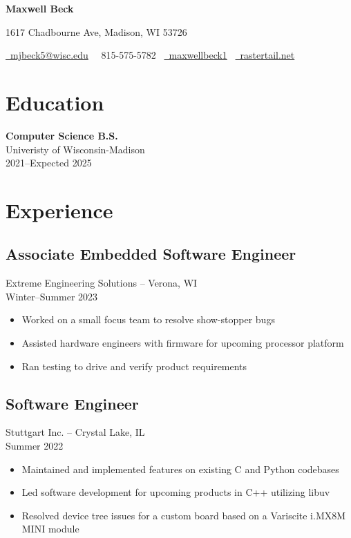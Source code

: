 \documentclass[letterpaper,10pt]{article}
\begin{document}
\raggedright

{\LARGE \bfseries Maxwell Beck}

\medskip

1617 Chadbourne Ave, Madison, WI 53726

\medskip

\href{mailto:mjbeck5@wisc.edu}{\faEnvelopeO\, mjbeck5@wisc.edu}
\, \faPhone\, 815-575-5782
\, \href{https://www.linkedin.com/in/maxwellbeck1}{\faLinkedin\, maxwellbeck1}
\, \href{https://rastertail.net/}{\faChain\, rastertail.net}

\section*{Education}

\textbf{Computer Science B.S.} \\
Univeristy of Wisconsin-Madison \\
2021--Expected 2025

\section*{Experience}

\subsection*{Associate Embedded Software Engineer}
Extreme Engineering Solutions -- Verona, WI \\
Winter--Summer 2023

\begin{itemize}[topsep=0.5em, partopsep=0em, itemsep=0.1em]
    \item Worked on a small focus team to resolve show-stopper bugs
    \item Assisted hardware engineers with firmware for upcoming processor platform
    \item Ran testing to drive and verify product requirements
\end{itemize}

\subsection*{Software Engineer}
Stuttgart Inc. -- Crystal Lake, IL \\
Summer 2022

\begin{itemize}[topsep=0.5em, partopsep=0em, itemsep=0.1em]
    \item Maintained and implemented features on existing C and Python codebases
    \item Led software development for upcoming products in C++ utilizing libuv
    \item Resolved device tree issues for a custom board based on a Variscite i.MX8M MINI module
\end{itemize}
\end{document}
